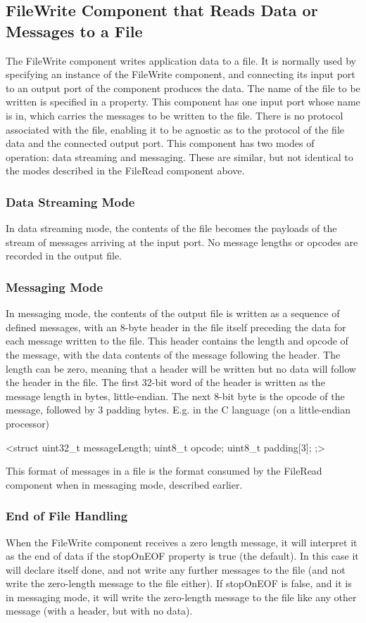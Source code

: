 \documentclass[10pt, a4paper, oneside]{article}
\renewcommand\_{\textunderscore\allowbreak} %
\begin{document}
\subsection {File\_Write Component that Reads Data or Messages to a File} The File\_Write component writes application data to a file. It is normally used by specifying an instance of the File\_Write component, and connecting its input port to an output port of the component produces the data.  The name of the file to be written is specified in a property. This component has one input port whose name is in, which carries the messages to be written to the file.  There is no protocol associated with the file, enabling it to be agnostic as to the protocol of the file data and the connected output port. This component has two modes of operation:  data streaming and messaging.  These are similar, but not identical to the modes described in the File\_Read component above.
\subsubsection{Data Streaming Mode} In data streaming mode, the contents of the file becomes the payloads of the stream of messages arriving at the input port.  No message lengths or opcodes are recorded in the output file.
\subsubsection{Messaging Mode} In messaging mode, the contents of the output file is written as a sequence of defined messages, with an 8-byte header in the file itself preceding the data for each message written to the file.  This header contains the length and opcode of the message, with the data contents of the message following the header.  The length can be zero, meaning that a header will be written but no data will follow the header in the file. 
The first 32-bit word of the header is written as the message length in bytes, little-endian.  The next 8-bit byte is the opcode of the message, followed by 3 padding bytes.  E.g. in the C language (on a little-endian processor) \begin{ocpixml}
<struct {
 uint32_t messageLength;
 uint8_t  opcode;
 uint8_t  padding[3];
};>\end{ocpixml}
This format of messages in a file is the format consumed by the File\_Read component when in messaging mode, described earlier.
\subsubsection{End of File Handling}When the File\_Write component receives a zero length message, it will interpret it as the end of data if the stopOnEOF property is true (the default).  In this case it will declare itself done, and not write any further messages to the file (and not write the zero-length message to the file either).  If stopOnEOF is false, and it is in messaging mode, it will write the zero-length message to the file like any other message (with a header, but with no data).
\end{document}
